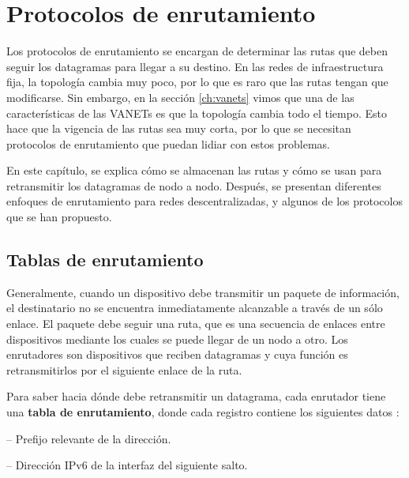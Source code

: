﻿%
\chapter{Protocolos de enrutamiento}

\label{ch:protocolos_de_enrutamiento}

Los protocolos de enrutamiento se encargan de determinar las rutas que deben
seguir los datagramas para llegar a su destino. En las redes de
infraestructura fija, la topología cambia muy poco, por lo que es raro que las
rutas tengan que modificarse. Sin embargo, en la sección \ref{ch:vanets} vimos
que una de las características de las VANETs es que la topología cambia todo el
tiempo. Esto hace que la vigencia de las rutas sea muy corta, por lo que se
necesitan protocolos de enrutamiento que puedan lidiar con estos problemas.

En este capítulo, se explica cómo se almacenan las rutas y cómo se usan para
retransmitir los datagramas de nodo a nodo. Después, se presentan diferentes
enfoques de enrutamiento para redes descentralizadas, y algunos de los
protocolos que se han propuesto.

\section{Tablas de enrutamiento}

\label{sec:tablas_de_enrutamiento}

Generalmente, cuando un dispositivo debe transmitir un paquete de información,
el destinatario no se encuentra inmediatamente alcanzable a través de un sólo
enlace. El paquete debe seguir una ruta, que es una secuencia de enlaces entre
dispositivos mediante los cuales se puede llegar de un nodo a otro. Los
enrutadores son dispositivos que reciben datagramas y cuya función es
retransmitirlos por el siguiente enlace de la ruta.

Para saber hacia dónde debe retransmitir un datagrama, cada enrutador tiene una
\textbf{tabla de enrutamiento}, donde cada registro contiene los siguientes
datos \cite{Hagen2006}:

 -- Prefijo relevante de la
dirección.

 -- Dirección IPv6 de la interfaz del
siguiente salto.


